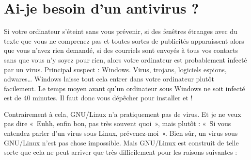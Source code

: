 \section{Ai-je besoin d'un antivirus ?}
Si votre ordinateur s'éteint sans vous prévenir, si des fenêtres étranges avec du texte que vous ne comprenez pas et toutes sortes de publicités apparaissent alors que vous n'avez rien demandé, si des courriels sont envoyés à tous vos contacts sans que vous n'y soyez pour rien, alors votre ordinateur est probablement infecté par un virus. Principal suspect : Windows. Virus, trojans, logiciels espions, adwares\ldots{} Windows laisse tout cela entrer dans votre ordinateur plutôt facilement. Le temps moyen avant qu'un ordinateur sous Windows ne soit infecté est de 40 minutes. Il faut donc vous dépêcher pour installer  et  !\par
Contrairement à cela, GNU/Linux n'a pratiquement pas de virus. Et je ne veux pas dire «~Euhh, enfin bon, pas très souvent quoi~», mais plutôt : «~Si vous entendez parler d'un virus sous Linux, prévenez-moi~». Bien sûr, un virus sous GNU/Linux n'est pas chose impossible. Mais GNU/Linux est construit de telle sorte que cela ne peut arriver que très difficilement pour les raisons suivantes :
